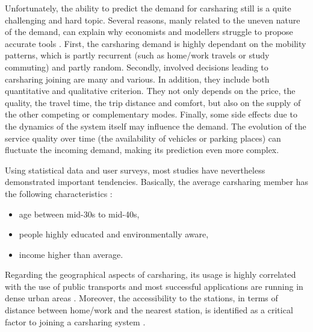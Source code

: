 \begin{bibunit}[ieeetr]
\medskip
Unfortunately, the ability to predict the demand for carsharing still is a quite challenging and hard topic.
Several reasons, manly related to the uneven nature of the demand, can explain why economists and modellers struggle to propose accurate tools \cite{danielis_potential_2015}.
First, the carsharing demand is highly dependant on the mobility patterns, which is partly recurrent (such as home/work travels or study commuting) and partly random.
Secondly, involved decisions leading to carsharing joining are many and various.
In addition, they include both quantitative and qualitative criterion.
They not only depends on the price, the quality, the travel time, the trip distance and comfort, but also on the supply of the other competing or complementary modes.
Finally, some side effects due to the dynamics of the system itself may influence the demand.
The evolution of the service quality over time (\eg the availability of vehicles or parking places) can fluctuate the incoming demand, making its prediction even more complex.

\medskip
Using statistical data and user surveys, most studies have nevertheless demonstrated important tendencies.
Basically, the average carsharing member has the following characteristics
\cite{brook_carsharingstart_2004}
\cite{millard_ball_car_sharing_2005}
\cite{lane_phillycarshare_2005}
\cite{zheng_carsharing_2009}
\cite{costain_synopsis_2012}
\cite{efthymiou_which_2012}:
\begin{itemize}
\item age between mid-30s to mid-40s,
\item people highly educated and environmentally aware,
\item income higher than average.
\end{itemize}

\bigskip
Regarding the geographical aspects of carsharing, its usage is highly correlated with the use of public transports and most successful applications are running in dense urban areas \cite{cervero_city_2003, millard_ball_car_sharing_2005, burkhardt_who_2006}.
Moreover, the accessibility to the stations, in terms of distance between home/work and the nearest station, is identified as a critical factor to joining a carsharing system \cite{zheng_carsharing_2009, costain_synopsis_2012, efthymiou_which_2012}.



\end{bibunit}
